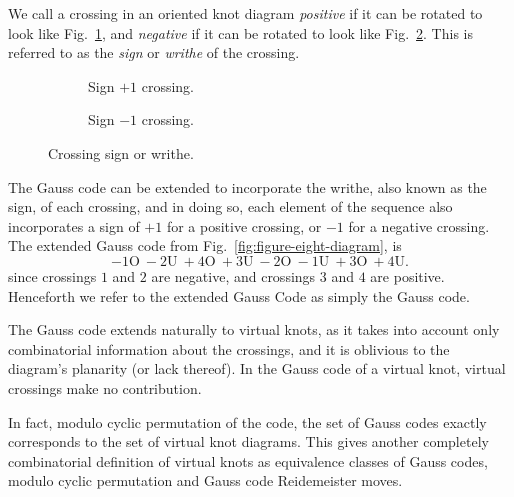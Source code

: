 \documentclass[12pt]{report}
\renewcommand{\over}{\text{O}}
\newcommand{\under}{\text{U}}
\theoremstyle{upright}
\begin{document}
We call a crossing in an oriented knot diagram \textit{positive} if it can be rotated to look like Fig.~\ref{fig:cross_pos}, and \textit{negative} if it can be rotated to look like Fig.~\ref{fig:cross_neg}. This is referred to as the \textit{sign} or \textit{writhe} of the crossing.

\begin{figure}[hbt]
	\centering
	\hspace*{\fill}
	\begin{subfigure}[b]{0.4 \textwidth}
		\centering
		\def\svgscale{0.28}
		
		\caption{Sign $+1$ crossing.}
		\label{fig:cross_pos}
	\end{subfigure}
	\hspace*{\fill} \hspace*{\fill}	\hspace*{\fill}
	\begin{subfigure}[b]{0.4 \textwidth}
		\centering
		\def\svgscale{0.28}
		
		\caption{Sign $-1$ crossing.}
		\label{fig:cross_neg}
	\end{subfigure}
	\hspace*{\fill} 
	\caption{Crossing sign or writhe.}
	\label{fig:crossing-sign}
\end{figure}

The Gauss code can be extended to incorporate the writhe, also known as the sign, of each crossing, and in doing so, each element of the sequence also incorporates a sign of $+1$ for a positive crossing, or $-1$ for a negative crossing. The extended Gauss code from Fig.~\ref{fig:figure-eight-diagram}, is
\[-1\over\ -2\under\ +4\over\ +3\under\ -2\over\ -1\under\ +3\over\ +4\under.\]
since crossings $1$ and $2$ are negative, and crossings $3$ and $4$ are positive. Henceforth we refer to the extended Gauss Code as simply the Gauss code.

The Gauss code extends naturally to virtual knots, as it takes into account only combinatorial information about the crossings, and it is oblivious to the diagram's planarity (or lack thereof). In the Gauss code of a virtual knot, virtual crossings make no contribution. 

In fact, modulo cyclic permutation of the code, the set of Gauss codes exactly corresponds to the set of virtual knot diagrams. This gives another completely combinatorial definition of virtual knots as equivalence classes of Gauss codes, modulo cyclic permutation and Gauss code Reidemeister moves.
\end{document}
